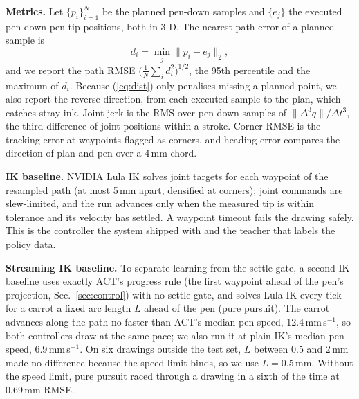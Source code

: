 \documentclass[conference]{IEEEtran}
\newcommand{\mm}{\,mm\xspace}
\begin{document}
\textbf{Metrics.} Let $\{p_i\}_{i=1}^{N}$ be the planned pen-down samples and $\{e_j\}$ the executed
pen-down pen-tip positions, both in 3-D. The nearest-path error of a planned sample is
\begin{equation}
  d_i = \min_j \lVert p_i - e_j \rVert_2 ,
  \label{eq:dist}
\end{equation}
and we report the path RMSE $\big(\tfrac{1}{N}\sum_i d_i^2\big)^{1/2}$, the 95th percentile and the maximum of
$d_i$. Because (\ref{eq:dist}) only penalises missing a planned point, we also report the reverse direction,
from each executed sample to the plan, which catches stray ink. Joint jerk is the RMS over pen-down samples of
$\lVert \Delta^3 q \rVert / \Delta t^3$, the third difference of joint positions within a stroke. Corner RMSE
is the tracking error at waypoints flagged as corners, and heading error compares the direction of plan and pen
over a 4\mm chord.

\textbf{IK baseline.} NVIDIA Lula IK solves joint targets for each waypoint of the resampled path (at most
5\mm apart, densified at corners); joint commands are slew-limited, and the run advances only when the measured
tip is within tolerance and its velocity has settled. A waypoint timeout fails the drawing safely. This is the
controller the system shipped with and the teacher that labels the policy data.

\textbf{Streaming IK baseline.} To separate learning from the settle gate, a second IK baseline uses exactly
ACT's progress rule (the first waypoint ahead of the pen's projection, Sec.~\ref{sec:control}) with no settle
gate, and solves Lula IK every tick for a carrot a fixed arc length $L$ ahead of the pen (pure pursuit). The carrot
advances along the path no faster than ACT's median pen speed, 12.4\mm\,s$^{-1}$, so both controllers draw at
the same pace; we also run it at plain IK's median pen speed, 6.9\mm\,s$^{-1}$. On six drawings outside the test
set, $L$ between 0.5 and 2\mm made no difference because the speed limit binds, so we use $L=0.5$\mm. Without
the speed limit, pure pursuit raced through a drawing in a sixth of the time at 0.69\mm RMSE.
\end{document}
